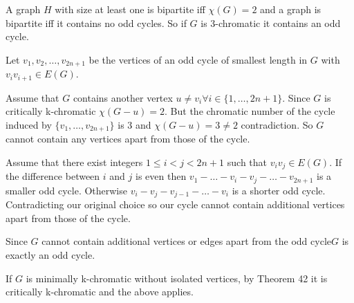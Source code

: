 A graph $H$ with size at least one is bipartite iff $\chi(G) = 2$ 
and a graph is bipartite iff it contains no odd cycles. 
So if $G$ is 3-chromatic it contains an odd cycle.

Let $v_1, v_2, \ldots, v_{2n+1}$ be the vertices of an odd
cycle of smallest length in $G$ with $v_iv_{i+1} \in E(G)$. 

Assume that $G$
contains another vertex $u \ne v_i \forall i \in \{1, \ldots, 2n+1\}$.
Since $G$ is
critically k-chromatic $\chi(G-u) = 2$. But the chromatic number of the
cycle induced by $\{ v_1, \ldots, v_{2n+1} \}$ is 3
and $\chi(G-u) = 3 \ne 2$ contradiction. So $G$ cannot contain any
vertices apart from those of the cycle.

Assume that there exist integers $1 \le i < j < 2n+1$ such
that $v_iv_j \in E(G)$. If the difference between $i$ and $j$
is even then $v_1 - \ldots - v_i - v_j - \ldots - v_{2n+1}$
is a smaller odd cycle. Otherwise
$v_i - v_j - v_{j-1} - \ldots -  v_i$ is a shorter odd cycle.
Contradicting our original choice so our cycle cannot contain
additional vertices apart from those of the cycle.

Since $G$ cannot contain additional vertices or edges apart from the
odd cycle$G$ is exactly an odd cycle.

If $G$ is minimally k-chromatic without isolated vertices, by Theorem
42 it is critically k-chromatic and the above applies.
